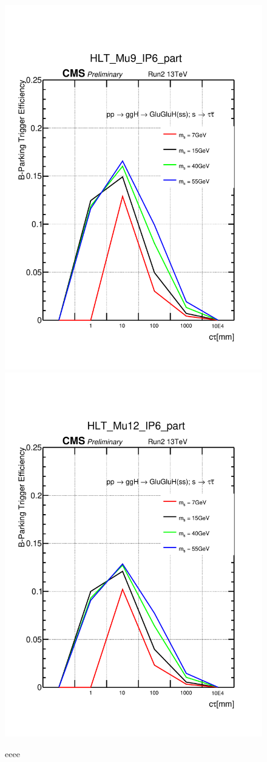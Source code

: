 \begin{figure}[h!]
  \caption{eeee}
  \label{fig:Trigger Efficiency2}
  \centering
  \includegraphics[width=0.47\linewidth]{figs/TrigEff_HLT_Mu9_IP6_part.pdf}
  \includegraphics[width=0.47\linewidth]{figs/TrigEff_HLT_Mu12_IP6_part.pdf}

\end{figure}
